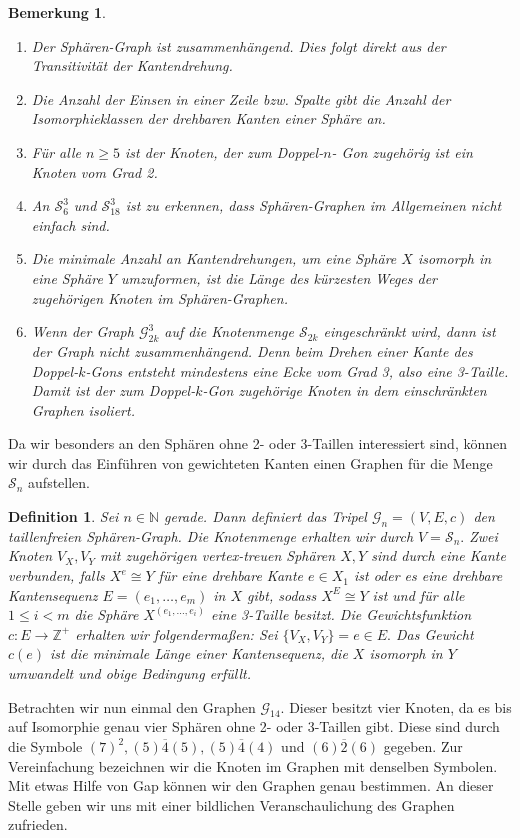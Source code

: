 \documentclass[12pt,titlepage,twoside,cleardoublepage]{article}
\theoremstyle{nummermitklammern}
\newtheorem{definition}[temp]{Definition}
\newtheorem{bemerkung}[temp]{Bemerkung}
\newtheorem{definition}[zahl]{Definition}
\newtheorem{bemerkung}[zahl]{Bemerkung}
\numberwithin{equation}{section}
\begin{document}
 \begin{bemerkung}
 \begin{enumerate}
 \item Der Sphären-Graph ist zusammenhängend. Dies folgt direkt aus der Transitivität der Kantendrehung.
 \item Die Anzahl der Einsen in einer Zeile bzw. Spalte gibt die Anzahl der Isomorphieklassen der drehbaren Kanten einer Sphäre an.
 \item Für alle $n\geq 5$ ist der Knoten, der zum Doppel-$n$-
 Gon zugehörig ist ein Knoten vom Grad 2.
 \item An $\mathcal{S}^3_6$ und $\mathcal{S}_{18}^3$ ist zu erkennen, dass Sphären-Graphen im Allgemeinen nicht einfach sind. 
 \item Die minimale Anzahl an Kantendrehungen, um eine Sphäre $X$ isomorph in eine Sphäre $Y$ umzuformen, ist die Länge des kürzesten Weges der zugehörigen Knoten im Sphären-Graphen.   
 \item Wenn der Graph $\mathcal{G}^3_{2k}$ auf die Knotenmenge $\mathcal{S}_{2k}$ eingeschränkt wird, dann ist der Graph nicht zusammenhängend. Denn beim Drehen einer Kante des Doppel-$k$-Gons entsteht mindestens eine Ecke vom Grad 3, also eine 3-Taille. Damit ist der zum Doppel-$k$-Gon zugehörige Knoten in dem einschränkten Graphen isoliert.
 \end{enumerate}
 \end{bemerkung}
 Da wir besonders an den Sphären ohne 2- oder 3-Taillen interessiert sind, können wir durch das Einführen von gewichteten Kanten einen Graphen für die Menge $\mathcal{S}_n$ aufstellen.
 \begin{definition}
Sei $n\in \mathbb{N}$ gerade. Dann definiert das Tripel $\mathcal{G}_n=(V,E,c)$ den \emph{taillenfreien Sphären-Graph}. Die Knotenmenge erhalten wir durch $V=\mathcal{S}_n.$ Zwei Knoten $V_X,V_Y$ mit zugehörigen vertex-treuen Sphären $X,Y$ sind durch eine Kante verbunden, falls $X^e\cong Y$ für eine drehbare Kante $e\in X_1$ ist oder es eine drehbare Kantensequenz $E=(e_1,\ldots,e_m)$ in $X$ gibt, sodass $X^E\cong Y$ ist und für alle $1\leq i < m $ die Sphäre $X^{(e_1,\ldots,e_i)}$ eine 3-Taille besitzt. Die Gewichtsfunktion $c:E\to\mathbb{Z}^+$  erhalten wir folgendermaßen: Sei $\{V_X,V_Y\}=e\in E.$ Das Gewicht $c(e)$ ist die minimale Länge einer Kantensequenz, die $X$ isomorph in $Y$ umwandelt und obige Bedingung erfüllt.
 \end{definition}
 Betrachten wir nun einmal den Graphen $\mathcal{G}_{14}.$
Dieser besitzt vier Knoten, da es bis auf Isomorphie genau vier Sphären ohne 2- oder 3-Taillen gibt. Diese sind durch die Symbole $(7)^2,(5)\overline{4}(5),(5)\overline{4}(4)$ und $(6)\overline{2}(6)$ gegeben. Zur Vereinfachung bezeichnen wir die Knoten im Graphen mit denselben Symbolen. Mit etwas Hilfe von Gap können wir den Graphen genau bestimmen. An dieser Stelle geben wir uns mit einer bildlichen Veranschaulichung des Graphen zufrieden.
\end{document}
